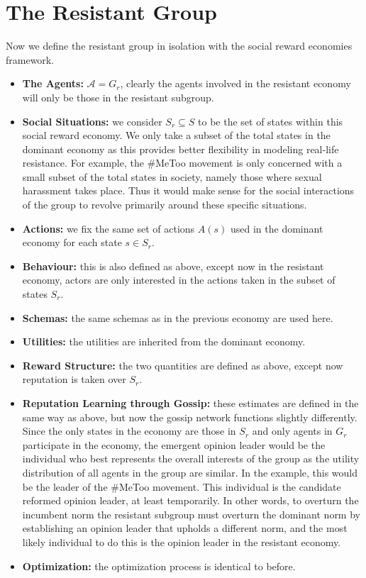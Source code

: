 \documentclass[12pt]{article}
\begin{document}
\section{The Resistant Group}
Now we define the resistant group in isolation with the social reward economies framework.
\begin{itemize}
    \item \textbf{The Agents:} $\mathcal A = G_r$, clearly the agents involved in the resistant economy
    will only be those in the resistant subgroup.
    \item \textbf{Social Situations:} we consider $S_r \subseteq S$ to be the set of states within this social reward economy.
    We only take a subset of the total states in the dominant economy as this provides better flexibility in modeling real-life
    resistance. For example, the \#MeToo movement is only concerned with a small subset of the total states in society,
    namely those where sexual harassment takes place. Thus it would make sense for the social interactions of the group
    to revolve primarily around these specific situations.
    \item \textbf{Actions:} we fix the same set of actions $A(s)$ used in the dominant economy for each state $s \in S_r$.
    \item \textbf{Behaviour:} this is also defined as above, except now in the resistant economy,
    actors are only interested in the actions taken in the subset of states $S_r$.
    \item \textbf{Schemas:} the same schemas as in the previous economy are used here.
    \item \textbf{Utilities:} the utilities are inherited from the dominant economy.
    \item \textbf{Reward Structure:} the two quantities are defined as above, except
    now reputation is taken over $S_r$.
    \item \textbf{Reputation Learning through Gossip:} these estimates are defined in the same way as above,
    but now the gossip network functions slightly differently. Since the only states in the economy
    are those in $S_r$ and only agents in $G_r$ participate in the economy, the emergent opinion leader
    would be the individual who best represents the overall interests of the group as the utility distribution
    of all agents in the group are similar. In the example, this would be the leader of the \#MeToo movement.
    This individual is the candidate reformed opinion leader, at least temporarily.
    In other words, to overturn the incumbent norm the resistant subgroup must overturn the dominant norm
    by establishing an opinion leader that upholds a different norm, and the most likely individual to do this
    is the opinion leader in the resistant economy.

    \item \textbf{Optimization:} the optimization process is identical to before.
\end{itemize}
\end{document}
